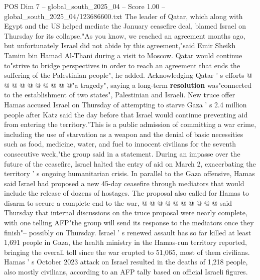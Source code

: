 \begin{textsample}{POS Dim 7 – global\_south\_2025\_04 – Score 1.00 – global\_south\_2025\_04/123686600.txt}
The leader of Qatar, which along with Egypt and the US helped mediate the January ceasefire deal, blamed Israel on Thursday for its collapse."As you know, we reached an agreement months ago, but unfortunately Israel did not abide by this agreement,"said Emir Sheikh Tamim bin Hamad Al-Thani during a visit to Moscow.
Qatar would continue to"strive to bridge perspectives in order to reach an agreement that ends the suffering of the Palestinian people", he added.
Acknowledging Qatar ' s efforts @ @ @ @ @ @ @ @ @ @"a tragedy", saying a long-term \textbf{resolution} was"connected to the establishment of two states", Palestinian and Israeli.
New truce offer Hamas accused Israel on Thursday of attempting to starve Gaza ' s 2.4 million people after Katz said the day before that Israel would continue preventing aid from entering the territory."This is a public admission of committing a war crime, including the use of starvation as a weapon and the denial of basic necessities such as food, medicine, water, and fuel to innocent civilians for the seventh consecutive week,"the group said in a statement.
During an impasse over the future of the ceasefire, Israel halted the entry of aid on March 2, exacerbating the territory ' s ongoing humanitarian crisis.
In parallel to the Gaza offensive, Hamas said Israel had proposed a new 45-day ceasefire through mediators that would include the release of dozens of hostages.
The proposal also called for Hamas to disarm to secure a complete end to the war, @ @ @ @ @ @ @ @ @ @ said Thursday that internal discussions on the truce proposal were nearly complete, with one telling AFP"the group will send its response to the mediators once they finish"-- possibly on Thursday.
Israel ' s renewed assault has so far killed at least 1,691 people in Gaza, the health ministry in the Hamas-run territory reported, bringing the overall toll since the war erupted to 51,065, most of them civilians.
Hamas ' s October 2023 attack on Israel resulted in the deaths of 1,218 people, also mostly civilians, according to an AFP tally based on official Israeli figures.

\end{textsample}
